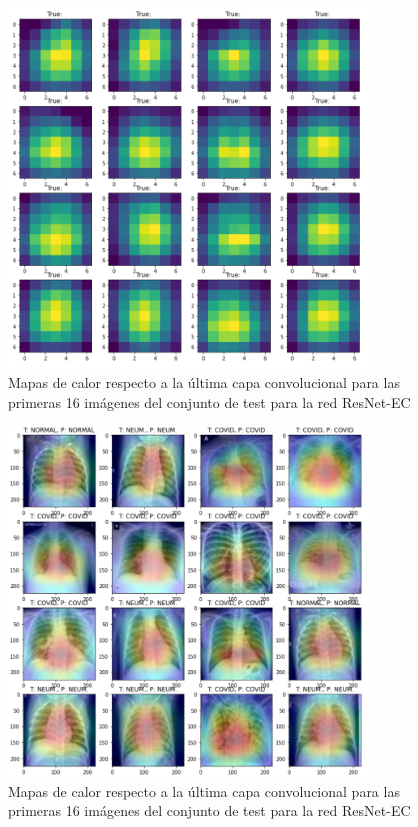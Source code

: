 \documentclass[11pt,a4paper]{article}
\theoremstyle{definition}
\begin{document}
\begin{figure}[H]
\centering
\includegraphics[width=0.85\textwidth]{./images/xceptionfilters}
\caption{Mapas de calor respecto a la última capa convolucional para las primeras 16 imágenes del conjunto de test para la red ResNet-EC}
\end{figure}

\begin{figure}[]
\centering
\includegraphics[width=0.85\textwidth]{./images/heatmapxception}
\caption{Mapas de calor respecto a la última capa convolucional para las primeras 16 imágenes del conjunto de test para la red ResNet-EC}
\end{figure}
\end{document}

